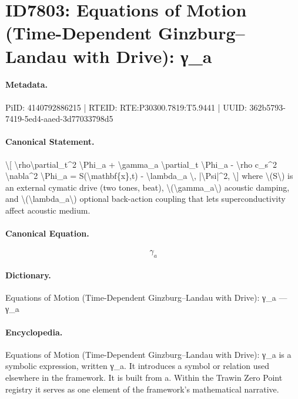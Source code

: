 \section*{ID7803: Equations of Motion (Time-Dependent Ginzburg–Landau with Drive): γ\_a}
\paragraph{Metadata.}
PiID: 4140792886215 | RTEID: RTE:P30300.7819:T5.9441 | UUID: 362b5793-7419-5ed4-aaed-3d77033798d5

\paragraph{Canonical Statement.}
\textbackslash{}[ \textbackslash{}rho\textbackslash{}partial\_t\textasciicircum{}2 \textbackslash{}Phi\_a + \textbackslash{}gamma\_a \textbackslash{}partial\_t \textbackslash{}Phi\_a - \textbackslash{}rho c\_s\textasciicircum{}2 \textbackslash{}nabla\textasciicircum{}2 \textbackslash{}Phi\_a = S(\textbackslash{}mathbf\{x\},t) - \textbackslash{}lambda\_a \textbackslash{}, |\textbackslash{}Psi|\textasciicircum{}2, \textbackslash{}] where \textbackslash{}(S\textbackslash{}) is an external cymatic drive (two tones, beat), \textbackslash{}(\textbackslash{}gamma\_a\textbackslash{}) acoustic damping, and \textbackslash{}(\textbackslash{}lambda\_a\textbackslash{}) optional back-action coupling that lets superconductivity affect acoustic medium.

\paragraph{Canonical Equation.}
\[
\gamma_a
\]

\paragraph{Dictionary.}
Equations of Motion (Time-Dependent Ginzburg–Landau with Drive): γ\_a — γ\_a

\paragraph{Encyclopedia.}
Equations of Motion (Time-Dependent Ginzburg–Landau with Drive): γ\_a is a symbolic expression, written γ\_a. It introduces a symbol or relation used elsewhere in the framework. It is built from a. Within the Trawin Zero Point registry it serves as one element of the framework's mathematical narrative.
